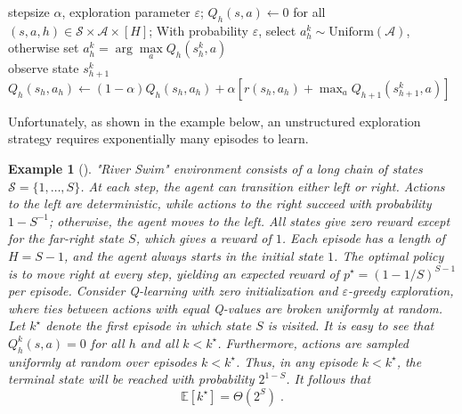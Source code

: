 \documentclass{article}
\numberwithin{equation}{section}
\newtheorem{example}{Example}
\newcommand{\cA}{\mathcal{A}}
\newcommand{\cS}{\mathcal{S}}
\newcommand{\eqsp}{\;}
\begin{document}
\begin{algorithm}[H]
    \centering
    \caption{Q-learning with \(\varepsilon\)-greedy exploration}
    \label{alg:q_rl_e_greedy}
    \begin{algorithmic}[1]
         stepsize \(\alpha\), exploration parameter \(\varepsilon\);
         $Q_h(s,a)\leftarrow 0$ for all $(s,a,h) \in {\cS\times \cA}\times [H]$;
          \STATE With probability $\varepsilon$, select $a_h^k \sim \text{Uniform}(\mathcal{A})$, otherwise set $a_h^k = \arg\max\limits_{a} Q_h(s_h^k, a)$ \\
           \STATE observe state \(s_{h+1}^k\)\\
          
          \(Q_h(s_h,a_h)\leftarrow (1-\alpha)Q_h(s_h,a_h) + \alpha[r(s_h,a_h) + \max_{a}Q_{h+1}(s_{h+1}^k, a)]\)\\
          \ENDFOR
        \ENDFOR
    \end{algorithmic}
\end{algorithm}

Unfortunately, as shown in the example below, an unstructured exploration strategy requires exponentially many episodes to learn.
    \begin{example}[\cite{osband2016generalization}]
"River Swim" environment consists of a long chain of states $\mathcal{S} = \{1, \dots, S\}$. At each step, the agent can transition either left or right. Actions to the left are deterministic, while actions to the right succeed with probability $1 - S^{-1}$; otherwise, the agent moves to the left. All states give zero reward except for the far-right state $S$, which gives a reward of $1$. Each episode has a length of $H = S - 1$, and the agent always starts in the initial state $1$. The optimal policy is to move right at every step, yielding an expected reward of \(p^\star = \left( 1 - 1/S \right)^{S-1}\) per episode. Consider Q-learning  with  {zero initialization and} \(\varepsilon\)-greedy exploration, {where ties between actions with equal Q-values are broken uniformly at random}{.} Let $k^{\star}$ denote the first episode in which state $S$ is visited. It is easy to see that $Q_{h}^k(s,a) = 0$ for all $h$ and all $k < k^{\star}$. Furthermore, actions are sampled uniformly at random over episodes $k < k^{\star}$. Thus, in any episode $k < k^{\star}$, the terminal state will be reached with probability $ 2^{1-S}$. It follows that  
\[
\mathbb{E}[k^{\star}] = {\Theta(2^S)}\eqsp.
\]

\end{example}
\end{document}
